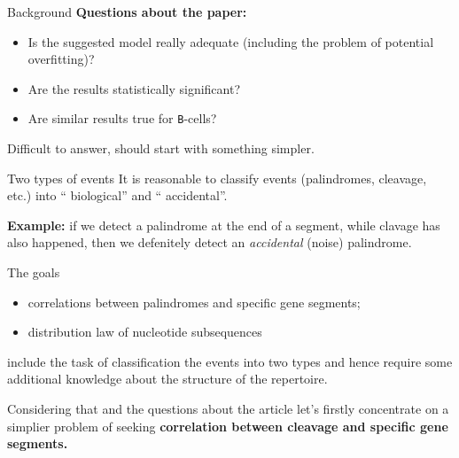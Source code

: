 \documentclass{beamer}\usepackage[]{graphicx}\usepackage[]{color}
\begin{document}
\begin{frame}{Background}
  \textbf{Questions about the paper:}
  \begin{itemize}
    \item Is the suggested model really adequate (including the problem of potential overfitting)?
    \item Are the results statistically significant?
    \item Are similar results true for \texttt{B}-cells?
  \end{itemize}
 
  \pause
  \bigskip
  {\color{blue} Difficult to answer, should start with something simpler.}
\end{frame}

\begin{frame}{Two types of events}
  It is reasonable to classify events (palindromes, cleavage, etc.) into ``{\color{blue} biological}'' and ``{\color{blue} accidental}''.
  
  \textbf{Example:} if we detect a palindrome at the end of a segment, while clavage has also happened, then we defenitely detect an \textit{accidental} (noise) palindrome.
\bigskip

  The goals 
  \begin{itemize}
    \item correlations between palindromes and specific gene segments;
    \item distribution law of nucleotide subsequences
  \end{itemize}
  include the task of classification the events into two types and hence require some additional knowledge about the structure of the repertoire.
 
  \bigskip
  Considering that and the questions about the article let's firstly concentrate on a simplier problem of seeking \textbf{correlation between cleavage and specific gene segments.} 
\end{frame}
\end{document}
